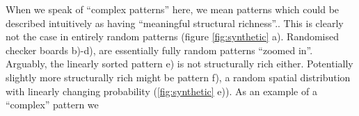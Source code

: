 When we speak of ``complex patterns'' here, we mean patterns which could be described intuitively as having ``meaningful structural richness''.\cite{EnotComplex1}. This is clearly not the case in entirely random patterns (figure \ref{fig:synthetic} a). Randomised checker boards b)-d), are essentially fully random patterns ``zoomed in''. Arguably, the linearly sorted pattern e) is not structurally rich either. Potentially slightly more structurally rich might be pattern f), a random spatial distribution with linearly changing probability (\ref{fig:synthetic} e)). As an example of a ``complex'' pattern we \cite{cheng1999multifractality}
